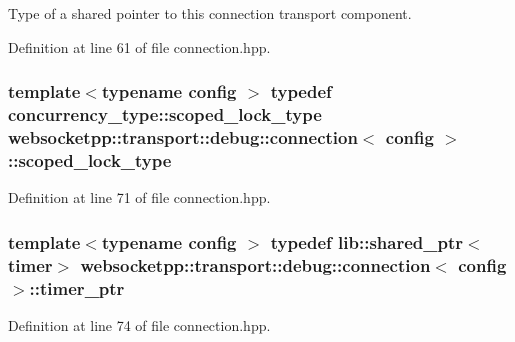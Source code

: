 Type of a shared pointer to this connection transport component. 



Definition at line 61 of file connection.\+hpp.

\hypertarget{classwebsocketpp_1_1transport_1_1debug_1_1connection_a6745c077e1f67447a8894c50699ad5d1}{}
\subsubsection[{scoped\+\_\+lock\+\_\+type}]{\setlength{\rightskip}{0pt plus 5cm}template$<$typename config $>$ typedef concurrency\+\_\+type\+::scoped\+\_\+lock\+\_\+type {\bf websocketpp\+::transport\+::debug\+::connection}$<$ config $>$\+::{\bf scoped\+\_\+lock\+\_\+type}}\label{classwebsocketpp_1_1transport_1_1debug_1_1connection_a6745c077e1f67447a8894c50699ad5d1}


Definition at line 71 of file connection.\+hpp.

\hypertarget{classwebsocketpp_1_1transport_1_1debug_1_1connection_a92ac093c337944c0d17422b090cc1e62}{}
\subsubsection[{timer\+\_\+ptr}]{\setlength{\rightskip}{0pt plus 5cm}template$<$typename config $>$ typedef lib\+::shared\+\_\+ptr$<${\bf timer}$>$ {\bf websocketpp\+::transport\+::debug\+::connection}$<$ config $>$\+::{\bf timer\+\_\+ptr}}\label{classwebsocketpp_1_1transport_1_1debug_1_1connection_a92ac093c337944c0d17422b090cc1e62}


Definition at line 74 of file connection.\+hpp.

\hypertarget{classwebsocketpp_1_1transport_1_1debug_1_1connection_a7ba7dc8bc337d2734b3c4651f4fa8056}{}

